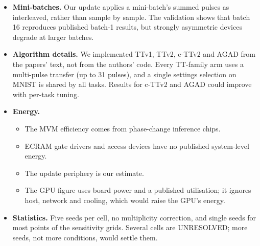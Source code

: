 \begin{itemize}
      analog LM is still about as far behind as FP-SGD is.
\item \textbf{Mini-batches.} Our update applies a mini-batch's summed pulses as interleaved, rather than sample by sample. The
      validation shows that batch 16 reproduces published batch-1 results, but strongly asymmetric devices degrade at larger
      batches.
\item \textbf{Algorithm details.} We implemented TTv1, TTv2, c-TTv2 and AGAD from the papers' text, not from the authors'
      code. Every TT-family arm uses a multi-pulse transfer (up to 31 pulses), and a single settings selection on MNIST is
      shared by all tasks. Results for c-TTv2 and AGAD could improve with per-task tuning.
\item \textbf{Energy.}
      \begin{itemize}
      \item The MVM efficiency comes from phase-change inference chips.
      \item ECRAM gate drivers and access devices have no published system-level energy.
      \item The update periphery is our estimate.
      \item The GPU figure uses board power and a published utilisation; it ignores host, network and cooling, which would
            raise the GPU's energy.
      \end{itemize}
\item \textbf{Statistics.} Five seeds per cell, no multiplicity correction, and single seeds for most points of the
      sensitivity grids. Several cells are UNRESOLVED; more seeds, not more conditions, would settle them.
\end{itemize}
